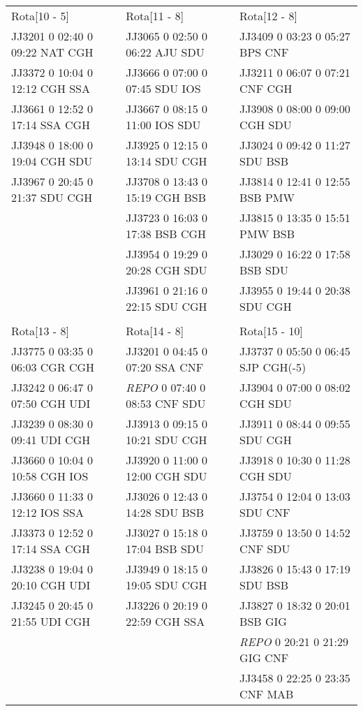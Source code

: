 \begin{scriptsize}
\begin{longtable}{l l l}
\\

Rota[10 - 5]  & Rota[11 - 8]  & Rota[12 - 8] \\
JJ3201 0 02:40 0 09:22 NAT CGH & JJ3065 0 02:50 0 06:22 AJU SDU & JJ3409 0 03:23 0 05:27 BPS CNF\\
JJ3372 0 10:04 0 12:12 CGH SSA & JJ3666 0 07:00 0 07:45 SDU IOS & JJ3211 0 06:07 0 07:21 CNF CGH\\
JJ3661 0 12:52 0 17:14 SSA CGH & JJ3667 0 08:15 0 11:00 IOS SDU & JJ3908 0 08:00 0 09:00 CGH SDU\\
JJ3948 0 18:00 0 19:04 CGH SDU & JJ3925 0 12:15 0 13:14 SDU CGH & JJ3024 0 09:42 0 11:27 SDU BSB\\
JJ3967 0 20:45 0 21:37 SDU CGH & JJ3708 0 13:43 0 15:19 CGH BSB & JJ3814 0 12:41 0 12:55 BSB PMW\\
 & JJ3723 0 16:03 0 17:38 BSB CGH & JJ3815 0 13:35 0 15:51 PMW BSB\\
 & JJ3954 0 19:29 0 20:28 CGH SDU & JJ3029 0 16:22 0 17:58 BSB SDU\\
 & JJ3961 0 21:16 0 22:15 SDU CGH & JJ3955 0 19:44 0 20:38 SDU CGH\\

\\


Rota[13 - 8]  & Rota[14 - 8]  & Rota[15 - 10] \\
JJ3775 0 03:35 0 06:03 CGR CGH & JJ3201 0 04:45 0 07:20 SSA CNF & JJ3737 0 05:50
0 06:45 SJP CGH(-5)\\ 
JJ3242 0 06:47 0 07:50 CGH UDI & \textit{REPO}   0 07:40 0
08:53 CNF SDU & JJ3904 0 07:00 0 08:02 CGH SDU\\ 
JJ3239 0 08:30 0 09:41 UDI CGH & JJ3913 0 09:15 0 10:21 SDU CGH & JJ3911 0 08:44 0 09:55 SDU CGH\\
JJ3660 0 10:04 0 10:58 CGH IOS & JJ3920 0 11:00 0 12:00 CGH SDU & JJ3918 0 10:30 0 11:28 CGH SDU\\
JJ3660 0 11:33 0 12:12 IOS SSA & JJ3026 0 12:43 0 14:28 SDU BSB & JJ3754 0 12:04 0 13:03 SDU CNF\\
JJ3373 0 12:52 0 17:14 SSA CGH & JJ3027 0 15:18 0 17:04 BSB SDU & JJ3759 0 13:50 0 14:52 CNF SDU\\
JJ3238 0 19:04 0 20:10 CGH UDI & JJ3949 0 18:15 0 19:05 SDU CGH & JJ3826 0 15:43 0 17:19 SDU BSB\\
JJ3245 0 20:45 0 21:55 UDI CGH & JJ3226 0 20:19 0 22:59 CGH SSA & JJ3827 0 18:32 0 20:01 BSB GIG\\
 &  & \textit{REPO}   0 20:21 0 21:29 GIG CNF\\
 &  & JJ3458 0 22:25 0 23:35 CNF MAB\\


\end{longtable}
\end{scriptsize}
